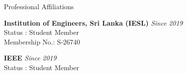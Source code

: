 \documentclass[
	11pt, %
]{./../assets/resume} %
\begin{document}





\begin{rSection}{Professional Affiliations}

	\textbf{Institution of Engineers, Sri Lanka (IESL)} \hfill \textit{Since 2019} \\ 
	Status : Student Member \\
	Membership No.: S-26740

	\textbf{IEEE} \hfill \textit{Since 2019} \\ 
	Status : Student Member \\

\end{rSection}





\end{document}
